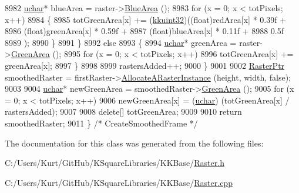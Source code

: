 \begin{DoxyCode}
8982       \hyperlink{namespace_k_k_b_ace9969169bf514f9ee6185186949cdf7}{uchar}*  blueArea  = raster->\hyperlink{class_k_k_b_1_1_raster_ade7c77867e6b3833e96f5f86aefcffec}{BlueArea} ();
8983       \textcolor{keywordflow}{for} (x = 0;  x < totPixels;  x++)
8984       \{
8985         totGreenArea[x] += (\hyperlink{namespace_k_k_b_af8d832f05c54994a1cce25bd5743e19a}{kkuint32})((\textcolor{keywordtype}{float})redArea[x]   * 0.39f +
8986                                   (float)greenArea[x] * 0.59f +
8987                                   (\textcolor{keywordtype}{float})blueArea[x]  * 0.11f +
8988                                   0.5f
8989                                  );
8990       \}
8991     \}
8992     \textcolor{keywordflow}{else}
8993     \{
8994       \hyperlink{namespace_k_k_b_ace9969169bf514f9ee6185186949cdf7}{uchar}*  greenArea = raster->\hyperlink{class_k_k_b_1_1_raster_af6ceacfa7835a295d239d141627dbec7}{GreenArea} ();
8995       \textcolor{keywordflow}{for} (x = 0;  x < totPixels;  x++)
8996         totGreenArea[x] += greenArea[x];
8997     \}
8998 
8999     rastersAdded++;
9000   \}
9001 
9002   \hyperlink{class_k_k_b_1_1_raster}{RasterPtr}  smoothedRaster = firstRaster->\hyperlink{class_k_k_b_1_1_raster_aa879980d112c01cb7ad9a3cfc7cd6f64}{AllocateARasterInstance} (height,
       width, \textcolor{keyword}{false});
9003 
9004   \hyperlink{namespace_k_k_b_ace9969169bf514f9ee6185186949cdf7}{uchar}*  newGreenArea = smoothedRaster->\hyperlink{class_k_k_b_1_1_raster_af6ceacfa7835a295d239d141627dbec7}{GreenArea} ();
9005   \textcolor{keywordflow}{for}  (x = 0;  x < totPixels;  x++)
9006     newGreenArea[x] = (\hyperlink{namespace_k_k_b_ace9969169bf514f9ee6185186949cdf7}{uchar})  (totGreenArea[x] / rastersAdded);
9007 
9008   \textcolor{keyword}{delete}[]  totGreenArea;
9009 
9010   \textcolor{keywordflow}{return}  smoothedRaster;
9011 \}  \textcolor{comment}{/* CreateSmoothedFrame */}
\end{DoxyCode}


The documentation for this class was generated from the following files\+:\begin{DoxyCompactItemize}
\item 
C\+:/\+Users/\+Kurt/\+Git\+Hub/\+K\+Square\+Libraries/\+K\+K\+Base/\hyperlink{_raster_8h}{Raster.\+h}\item 
C\+:/\+Users/\+Kurt/\+Git\+Hub/\+K\+Square\+Libraries/\+K\+K\+Base/\hyperlink{_raster_8cpp}{Raster.\+cpp}\end{DoxyCompactItemize}
